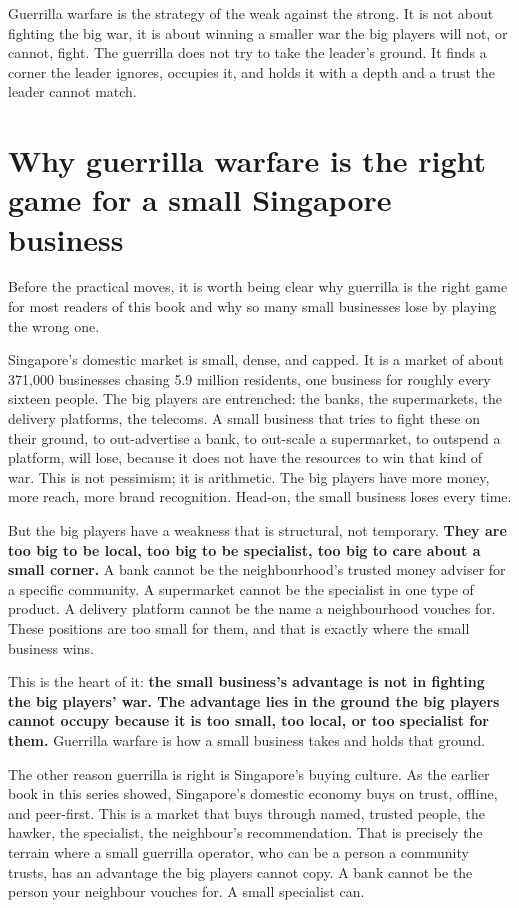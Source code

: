 \documentclass[10pt,twoside,openany]{memoir}
\newcommand{\needspacehead}{\needspace{4\baselineskip}}
\let\oldsection\section
\renewcommand{\section}{\needspacehead\oldsection}
\begin{document}
{Guerrilla warfare is the strategy of the weak against the strong. It is
not about fighting the big war, it is about winning a smaller war the
big players will not, or cannot, fight. The guerrilla does not try to
take the leader's ground. It finds a corner the leader ignores, occupies
it, and holds it with a depth and a trust the leader cannot match.

\section{Why guerrilla warfare is the right game for a small Singapore
business}\label{why-guerrilla-warfare-is-the-right-game-for-a-small-singapore-business}

Before the practical moves, it is worth being clear why guerrilla is the
right game for most readers of this book and why so many small
businesses lose by playing the wrong one.

Singapore's domestic market is small, dense, and capped. It is a market
of about 371,000 businesses chasing 5.9 million residents, one business
for roughly every sixteen people. The big players are entrenched: the
banks, the supermarkets, the delivery platforms, the telecoms. A small
business that tries to fight these on their ground, to out-advertise a
bank, to out-scale a supermarket, to outspend a platform, will lose,
because it does not have the resources to win that kind of war. This is
not pessimism; it is arithmetic. The big players have more money, more
reach, more brand recognition. Head-on, the small business loses every
time.

But the big players have a weakness that is structural, not temporary.
\textbf{They are too big to be local, too big to be specialist, too big
to care about a small corner.} A bank cannot be the neighbourhood's
trusted money adviser for a specific community. A supermarket cannot be
the specialist in one type of product. A delivery platform cannot be the
name a neighbourhood vouches for. These positions are too small for
them, and that is exactly where the small business wins.

This is the heart of it: \textbf{the small business's advantage is not
in fighting the big players' war. The advantage lies in the ground the
big players cannot occupy because it is too small, too local, or too
specialist for them.} Guerrilla warfare is how a small business takes
and holds that ground.

The other reason guerrilla is right is Singapore's buying culture. As
the earlier book in this series showed, Singapore's domestic economy
buys on trust, offline, and peer-first. This is a market that buys
through named, trusted people, the hawker, the specialist, the
neighbour's recommendation. That is precisely the terrain where a small
guerrilla operator, who can be a person a community trusts, has an
advantage the big players cannot copy. A bank cannot be the person your
neighbour vouches for. A small specialist can.

}
\end{document}
